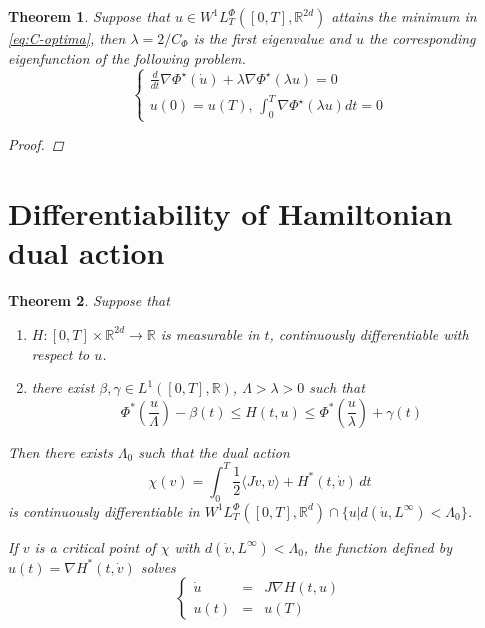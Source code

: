 \documentclass[twoside]{article}
\newtheorem{thm}{Theorem}[section]
\theoremstyle{remark}
\newcommand{\lphi}{L^{\Phi}}
\newcommand{\wphit}{W^{1}\lphi_T}
\newcommand{\rr}{\mathbb{R}}
\renewcommand{\leq}{\leqslant}
\newcommand{\Phie}{\Phi^{\star}}
\begin{document}
\begin{thm}\label{thm:C-opt-hamil} Suppose that $u\in \wphit([0,T],\rr^{2d})$ attains the minimum in \eqref{eq:C-optima}, then $\lambda=2/C_{\Phi}$ is the first eigenvalue and $u$ the corresponding eigenfunction of the following problem.
\begin{equation}\label{eq:eigen_prob}
\left\{
\begin{array}{l}
 \frac{d}{dt}\nabla\Phie(\dot{u})+\lambda\nabla\Phie(\lambda u)=0\\
 u(0)=u(T), \, \int_0^T\nabla\Phie (\lambda u)dt=0
\end{array}
\right.\tag{Eig}
\end{equation}
\begin{proof} 
 
\end{proof}






 
\end{thm}









\section{Differentiability of Hamiltonian dual action}

\begin{thm}
Suppose that 
\begin{enumerate}
\item \label{it:h1-prop-H}
$H:[0,T]\times\rr^{2d}\to \rr$ is measurable in $t$, continuously differentiable with respect to $u$.
\item \label{it:h2-cotaH-conjphi}there exist $\beta, \gamma \in L^1([0,T],\rr)$, $\Lambda>\lambda>0$ such that
\begin{equation}\label{eq:cota-H-phi-conj}
\Phi^*\left(\frac{u}{\Lambda}\right)-\beta(t)\leq H(t,u) \leq \Phi^*\left(\frac{u}{\lambda}\right)+\gamma(t)
\end{equation}
\end{enumerate}
Then there exists $\Lambda_0$ such that the dual action
\[
\chi(v)=\int_0^T \frac{1}{2} \langle J\dot{v},v\rangle+H^*(t,\dot{v})\,dt
\]
is continuously differentiable in $\wphit([0,T],\rr^d) \cap \{u|d(\dot{u},L^{\infty})<\Lambda_0\}$.

If $v$ is a critical point of $\chi$ with $d(\dot{v},L^{\infty})<\Lambda_0$, the function defined by 
$u(t)=\nabla  H^*(t,\dot{v})$
solves 
\[
\left\{\begin{array} {lll}
\dot{u}&=&J\nabla H (t,u)
\\
u(t)&=&u(T)
\end{array}
\right.
\]
\end{thm}
\end{document}
